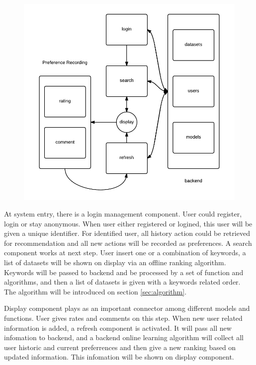 \documentclass[twoside,11pt]{article}
\begin{document}
        \begin{figure}[htbp]
            \centering
            \includegraphics[width=0.95\linewidth]{workflow.png}
            \caption{}
            \label{fig:Work Flow}
        \end{figure}

        At system entry, there is a login management component. User could register, login or stay anonymous. When user either registered or logined, this user will be given a unique identifier. For identified user, all history action could be retrieved for recommendation and all new actions will be recorded as preferences. A search component works at next step. User insert one or a combination of keywords, a list of datasets will be shown on display via an offline ranking algorithm. Keywords will be passed to backend and be processed by a set of function and algorithms, and then a list of datasets is given with a keywords related order. The algorithm will be introduced on section \ref{sec:algorithm}.

        Display component plays as an important connector among different models and functions. User gives rates and comments on this step. When new user related information is added, a refresh component is activated. It will pass all new infomation to backend, and a backend online learning algorithm will collect all user historic and current preferrences and then give a new ranking based on updated information. This infomation will be shown on display component.
\end{document}
